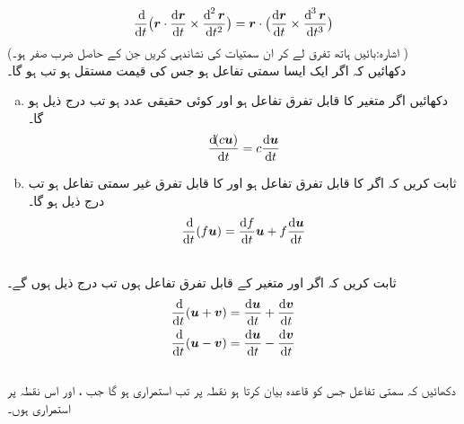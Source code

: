 \begin{align}\label{مساوات_سمتی_تفاعل_سہ_ضرب_تفرق_پ}
\frac{\dif}{\dif t}\big(\kvec{r}\cdot\frac{\dif \kvec{r}}{\dif t}\times \frac{\dif^{\,2}\kvec{r}}{\dif t^2}\big)=\kvec{r}\cdot\big(\frac{\dif \kvec{r}}{\dif t}\times \frac{\dif^{\,3}\kvec{r}}{\dif t^3}\big)
\end{align}
(اشارہ:بائیں ہاتھ تفرق لے کر ان سمتیات کی نشاندہی کریں جن کے  حاصل ضرب صفر ہو۔ )
\\
دکھائیں کہ اگر  ایک ایسا سمتی تفاعل ہو جس کی قیمت مستقل  ہو  تب  ہو گا۔
\\
\begin{enumerate}[a.]
\item
دکھائیں اگر  متغیر  کا قابل تفرق تفاعل ہو اور  کوئی حقیقی عدد ہو تب درج ذیل ہو گا۔
\begin{align*}
\frac{\dif(c\kvec{u})}{\dif t}=c\frac{\dif \kvec{u}}{\dif t}
\end{align*}
\item
ثابت کریں کہ  اگر  کا  قابل تفرق تفاعل ہو اور  کا  قابل تفرق  غیر سمتی  تفاعل ہو تب درج ذیل ہو گا۔
\begin{align*}
\frac{\dif}{\dif t}(f\kvec{u})=\frac{\dif f}{\dif t}\kvec{u}+f\frac{\dif \kvec{u}}{\dif t}
\end{align*}
\end{enumerate}
\\
ثابت کریں کہ اگر  اور  متغیر  کے قابل تفرق تفاعل ہوں تب درج ذیل ہوں  گے۔
\begin{align*}
\frac{\dif}{\dif t}(\kvec{u}+\kvec{v})=\frac{\dif \kvec{u}}{\dif t}+\frac{\dif \kvec{v}}{\dif t}\\
\frac{\dif}{\dif t}(\kvec{u}-\kvec{v})=\frac{\dif \kvec{u}}{\dif t}-\frac{\dif \kvec{v}}{\dif t}
\end{align*}
\\
دکھائیں کہ سمتی تفاعل  جس کو قاعدہ  بیان کرتا ہو نقطہ  پر تب استمراری ہو گا جب ،  اور  اس نقطہ پر استمراری ہوں۔
\\
